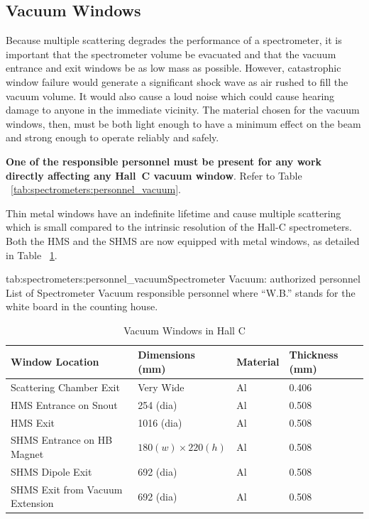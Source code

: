 \subsection{Vacuum Windows}

Because multiple scattering degrades the performance of a spectrometer, it is
important that the spectrometer volume be evacuated and that the vacuum
entrance and exit windows be as low mass as possible. However,
catastrophic window failure would generate a significant shock wave as air
rushed to fill the vacuum volume. It would also cause a loud noise which
could cause hearing damage to anyone in the immediate vicinity.
The material chosen for the vacuum windows, then, must be both light enough
to have a minimum effect on the beam and strong enough to operate reliably and safely.

{\bf One of the responsible personnel must be present for
any work directly affecting any Hall~C vacuum window}. Refer to Table ~\ref{tab:spectrometers:personnel_vacuum}.

Thin metal windows have an indefinite lifetime and cause
multiple scattering which is small compared to the intrinsic resolution of
the Hall-C spectrometers. Both the HMS and the SHMS are now equipped
with metal windows, as detailed in Table ~\ref{tab:hall_c_windows_specs}.

\begin{namestab}{tab:spectrometers:personnel_vacuum}{Spectrometer Vacuum: authorized personnel}{%
      List of Spectrometer Vacuum responsible personnel where ``W.B.'' stands for the white board 
      in the counting house.}
   \MikeFowler{}
   \WalterKellner{}
   \AndyKenyon{}
\end{namestab}

\begin{table}
\begin{center}
\caption{Vacuum Windows in Hall C\label{tab:hall_c_windows_specs}}
\begin{tabular}{|l|l|l|l|} 
\hline
Window Location				& Dimensions (mm) 	 	& Material & Thickness (mm) \\ \hline
Scattering Chamber Exit			& Very Wide		& Al		& 0.406\\
HMS Entrance	on Snout			& 254  (dia)		& Al		& 0.508\\
HMS Exit						& 1016  (dia)		& Al		& 0.508\\
SHMS Entrance on HB Magnet		& $180(w) \times 220(h)$	& Al	& 0.508\\
SHMS Dipole Exit				& 692 (dia)		& Al		& 0.508\\
SHMS Exit from Vacuum Extension	& 692 (dia)		& Al		& 0.508\\
\hline
\end{tabular}
\end{center}
\end{table}

